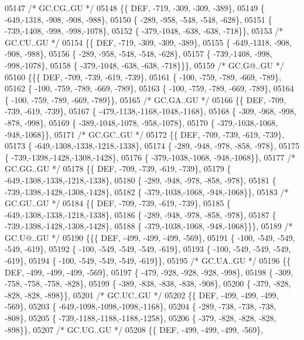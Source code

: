 \begin{DoxyCode}
05147 \textcolor{comment}{/* GC.CG..GU */}
05148 \{\{  DEF, -719, -309, -309, -389\},
05149 \{ -649,-1318, -908, -908, -988\},
05150 \{ -289, -958, -548, -548, -628\},
05151 \{ -739,-1408, -998, -998,-1078\},
05152 \{ -379,-1048, -638, -638, -718\}\},
05153 \textcolor{comment}{/* GC.CU..GU */}
05154 \{\{  DEF, -719, -309, -309, -389\},
05155 \{ -649,-1318, -908, -908, -988\},
05156 \{ -289, -958, -548, -548, -628\},
05157 \{ -739,-1408, -998, -998,-1078\},
05158 \{ -379,-1048, -638, -638, -718\}\}\},
05159 \textcolor{comment}{/* GC.G@..GU */}
05160 \{\{\{  DEF, -709, -739, -619, -739\},
05161 \{ -100, -759, -789, -669, -789\},
05162 \{ -100, -759, -789, -669, -789\},
05163 \{ -100, -759, -789, -669, -789\},
05164 \{ -100, -759, -789, -669, -789\}\},
05165 \textcolor{comment}{/* GC.GA..GU */}
05166 \{\{  DEF, -709, -739, -619, -739\},
05167 \{ -479,-1138,-1168,-1048,-1168\},
05168 \{ -309, -968, -998, -878, -998\},
05169 \{ -389,-1048,-1078, -958,-1078\},
05170 \{ -379,-1038,-1068, -948,-1068\}\},
05171 \textcolor{comment}{/* GC.GC..GU */}
05172 \{\{  DEF, -709, -739, -619, -739\},
05173 \{ -649,-1308,-1338,-1218,-1338\},
05174 \{ -289, -948, -978, -858, -978\},
05175 \{ -739,-1398,-1428,-1308,-1428\},
05176 \{ -379,-1038,-1068, -948,-1068\}\},
05177 \textcolor{comment}{/* GC.GG..GU */}
05178 \{\{  DEF, -709, -739, -619, -739\},
05179 \{ -649,-1308,-1338,-1218,-1338\},
05180 \{ -289, -948, -978, -858, -978\},
05181 \{ -739,-1398,-1428,-1308,-1428\},
05182 \{ -379,-1038,-1068, -948,-1068\}\},
05183 \textcolor{comment}{/* GC.GU..GU */}
05184 \{\{  DEF, -709, -739, -619, -739\},
05185 \{ -649,-1308,-1338,-1218,-1338\},
05186 \{ -289, -948, -978, -858, -978\},
05187 \{ -739,-1398,-1428,-1308,-1428\},
05188 \{ -379,-1038,-1068, -948,-1068\}\}\},
05189 \textcolor{comment}{/* GC.U@..GU */}
05190 \{\{\{  DEF, -499, -499, -499, -569\},
05191 \{ -100, -549, -549, -549, -619\},
05192 \{ -100, -549, -549, -549, -619\},
05193 \{ -100, -549, -549, -549, -619\},
05194 \{ -100, -549, -549, -549, -619\}\},
05195 \textcolor{comment}{/* GC.UA..GU */}
05196 \{\{  DEF, -499, -499, -499, -569\},
05197 \{ -479, -928, -928, -928, -998\},
05198 \{ -309, -758, -758, -758, -828\},
05199 \{ -389, -838, -838, -838, -908\},
05200 \{ -379, -828, -828, -828, -898\}\},
05201 \textcolor{comment}{/* GC.UC..GU */}
05202 \{\{  DEF, -499, -499, -499, -569\},
05203 \{ -649,-1098,-1098,-1098,-1168\},
05204 \{ -289, -738, -738, -738, -808\},
05205 \{ -739,-1188,-1188,-1188,-1258\},
05206 \{ -379, -828, -828, -828, -898\}\},
05207 \textcolor{comment}{/* GC.UG..GU */}
05208 \{\{  DEF, -499, -499, -499, -569\},

\end{DoxyCode}
